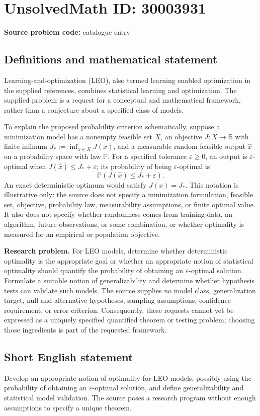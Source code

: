 \documentclass[11pt]{article}
\newcommand{\R}{\mathbb{R}}
\begin{document}
\section*{UnsolvedMath ID: 30003931}
\textbf{Source problem code:} catalogue entry
\subsection{Definitions and mathematical statement}
Learning-and-optimization (LEO), also termed learning enabled optimization in the supplied references, combines statistical learning and optimization. The supplied problem is a request for a conceptual and mathematical framework, rather than a conjecture about a specified class of models.

To explain the proposed probability criterion schematically, suppose a minimization model has a nonempty feasible set \(X\), an objective \(J:X\to\R\) with finite infimum \(J_*:=\inf_{x\in X}J(x)\), and a measurable random feasible output \(\widehat x\) on a probability space with law \(\mathbb P\). For a specified tolerance \(\varepsilon\geq 0\), an output is \(\varepsilon\)-optimal when \(J(\widehat x)\leq J_*+\varepsilon\); its probability of being \(\varepsilon\)-optimal is
\[
\mathbb P\!\left(J(\widehat x)\leq J_*+\varepsilon\right).
\]
An exact deterministic optimum would satisfy \(J(x)=J_*\). This notation is illustrative only: the source does not specify a minimization formulation, feasible set, objective, probability law, measurability assumptions, or finite optimal value. It also does not specify whether randomness comes from training data, an algorithm, future observations, or some combination, or whether optimality is measured for an empirical or population objective.

\textbf{Research problem.} For LEO models, determine whether deterministic optimality is the appropriate goal or whether an appropriate notion of statistical optimality should quantify the probability of obtaining an \(\varepsilon\)-optimal solution. Formulate a suitable notion of generalizability and determine whether hypothesis tests can validate such models. The source supplies no model class, generalization target, null and alternative hypotheses, sampling assumptions, confidence requirement, or error criterion. Consequently, these requests cannot yet be expressed as a uniquely specified quantified theorem or testing problem; choosing those ingredients is part of the requested framework.
\subsection{Short English statement}
Develop an appropriate notion of optimality for LEO models, possibly using the probability of obtaining an \(\varepsilon\)-optimal solution, and define generalizability and statistical model validation. The source poses a research program without enough assumptions to specify a unique theorem.
\end{document}
